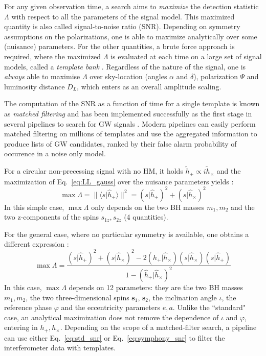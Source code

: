 \documentclass[twocolumn,showpacs,preprintnumbers,nofootinbib,prd,
superscriptaddress,10pt]{revtex4-2}
\newcommand{\scalar}[2]{\langle #1|#2 \rangle}
\newcommand{\rescalar}[2]{( #1 |#2 )}
\begin{document}
For any given observation time, a search aims to {\it maximize} the detection statistic $\Lambda$ with respect to all the parameters of the signal model. This maximized quantity is also called signal-to-noise ratio (SNR).
Depending on symmetry assumptions on the polarizations, one is able to maximize analytically over some (nuisance) parameters.
For the other quantities, a brute force approach is required, where the maximized $\Lambda$ is evaluated at each time on a large set of signal models, called a {\it template bank} \cite{PhysRevD.77.104017, Mukherjee:2018yra}.
Regardless of the nature of the signal, one is {\it always} able to maximise $\Lambda$ over sky-location (angles $\alpha$ and $\delta$), polarization $\Psi$ and luminosity distance $D_L$, which enters as an overall amplitude scaling.

The computation of the SNR as a function of time for a single template is known as {\it matched filtering} and has been implemented successfully as the first stage in several pipelines to search for GW signals \cite{Privitera:2013xza, Usman:2015kfa, Capano:2016dsf, PhysRevD.95.042001, Nitz:2017svb, gstlal_paper2, Aubin:2020goo, Chu:2020pjv}. Modern pipelines can easily perform matched filtering on millions of templates and use the aggregated information to produce lists of GW candidates, ranked by their false alarm probability of occurence in a noise only model.

For a circular non-precessing signal with no HM, it holds $\tilde{h}_+ \propto i\tilde{h}_\times$ and the maximization of Eq.~\eqref{eq:LL_gauss} over the nuisance parameters yields \cite{Maggiore:2007ulw}:
\begin{equation}\label{eq:std_snr}
	\max \Lambda = \lVert \scalar{s}{\hat{h}_+} \rVert^2 = \rescalar{s}{\hat{h}_+}^2 + \rescalar{s}{\hat{h}_\times}^2
\end{equation}
In this simple case, $\max\Lambda$ only depends on the two BH masses $m_1, m_2$ and the two z-components of the spins $s_{1z}, s_{2z}$ (4 quantities).

For the general case, where no particular symmetry is available, one obtains a different expression \cite{Capano:2013raa, Schmidt:2014iyl, Harry:2017weg}:
\begin{equation}\label{eq:symphony_snr}
	\max \Lambda = \frac{ \rescalar{s}{\hat{h}_+}^2 + \rescalar{s}{\hat{h}_\times}^2 -2\rescalar{\hat{h}_+}{\hat{h}_\times}\rescalar{s}{\hat{h}_\times}\rescalar{s}{\hat{h}_+}}{1- \rescalar{\hat{h}_+}{\hat{h}_\times}^2}
\end{equation}
In this case, $\max\Lambda$ depends on 12 parameters: they are the two BH masses $m_1, m_2$, the two three-dimensional spins $\mathbf{s}_1$, $\mathbf{s}_2$, the inclination angle $\iota$, the reference phase $\varphi$ and the eccentricity parameters $e, a$.
Unlike the ``standard" case, an analytical maximization does not remove the dependence of $\iota$ and $\varphi$, entering in $h_+, h_\times$.
%
Depending on the scope of a matched-filter search, a pipeline can use either Eq.~\eqref{eq:std_snr} or Eq.~\eqref{eq:symphony_snr} to filter the interferometer data with templates.
\end{document}
